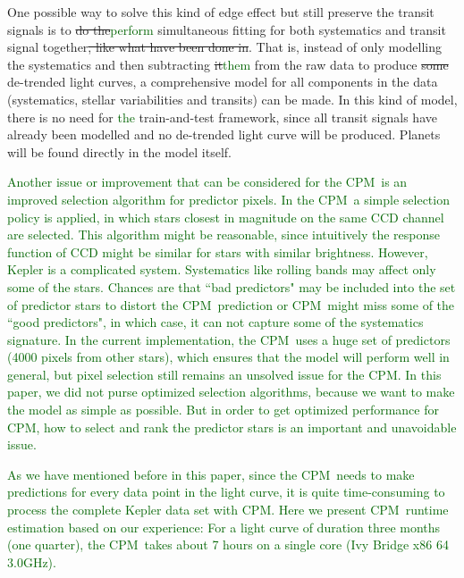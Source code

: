 \documentclass[12pt, preprint]{aastex}
\newcommand{\name}{CPM}
\newcommand{\revise}[1]{\textcolor{darkgreen}{#1}}
\newcommand{\remove}[1]{\sout{#1}}
\begin{document}
One possible way to solve this kind of edge effect but still preserve the transit signals is to \remove{do the}\revise{perform} simultaneous fitting for both systematics and transit signal together\remove{, like what have been done in}\citep{dfm}. 
That is,  instead of only modelling the systematics and then subtracting \remove{it}\revise{them} from the raw data to produce \remove{some }de-trended light curves, a comprehensive model for all components in the data (systematics, stellar variabilities and transits)  can be made. In this kind of model, there is no need for \revise{the} train-and-test framework, since all transit signals have already been modelled and no de-trended light curve will be produced. Planets will be found directly in the model itself. 

\revise{Another issue or improvement that can be considered for the \name\ is an improved selection algorithm for predictor pixels. 
In the \name\, a simple selection policy is applied, in which stars closest in magnitude on the same CCD channel are selected. This algorithm might be reasonable, since intuitively the response function of CCD might be similar for stars with similar brightness. 
However, Kepler is a complicated system. Systematics like rolling bands \citep{handbook} may affect only some of the stars. Chances are that ``bad predictors" may be included into the set of predictor stars to distort the \name\ prediction or \name\ might miss some of the ``good predictors", in which case, it can not capture some of the systematics signature. In the current implementation, the \name\ uses a huge set of predictors (4000 pixels from other stars), which ensures that the model will perform well in general, but pixel selection still remains an unsolved issue for the \name.
In this paper, we did not purse optimized selection algorithms, because we want to make the model as simple as possible. But in order to get optimized performance for \name, how to select and rank the predictor stars is an important and unavoidable issue.}

\revise{As we have mentioned before in this paper,  since the \name\ needs to make predictions for every data point in the light curve, it is quite time-consuming to process the complete Kepler data set with \name. Here we present \name\ runtime estimation based on our experience: For a light curve of duration three months (one quarter), the \name\ takes about 7 hours on a single core (Ivy Bridge x86 64 3.0GHz).}
\end{document}
